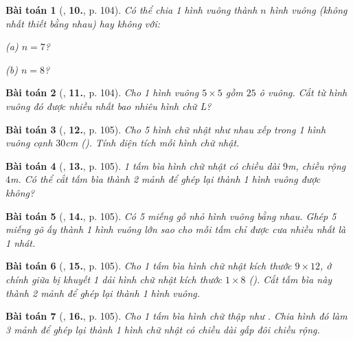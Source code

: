 \documentclass{article}
\numberwithin{equation}{section}
\newtheorem{baitoan}{Bài toán}[section]
\begin{document}
\begin{baitoan}[\cite{Binh_Toan_6_tap_1}, \textbf{10.}, p. 104]
	Có thể chia 1 hình vuông thành $n$ hình vuông (không nhất thiết bằng nhau) hay không với:
	\begin{enumerate*}
		\item[(a)] $n = 7$?
		\item[(b)] $n = 8$?
	\end{enumerate*}
\end{baitoan}

\begin{baitoan}[\cite{Binh_Toan_6_tap_1}, \textbf{11.}, p. 104]
	Cho 1 hình vuông $5\times 5$ gồm $25$ ô vuông. Cắt từ hình vuông đó được nhiều nhất bao nhiêu hình chữ L?
\end{baitoan}

\begin{baitoan}[\cite{Binh_Toan_6_tap_1}, \textbf{12.}, p. 105]
	Cho 5 hình chữ nhật như nhau xếp trong 1 hình vuông cạnh $30$\emph{cm} (\cite[Hình 31, p. 104]{Binh_Toan_6_tap_1}). Tính diện tích mỗi hình chữ nhật.
\end{baitoan}

\begin{baitoan}[\cite{Binh_Toan_6_tap_1}, \textbf{13.}, p. 105]
	1 tấm bìa hình chữ nhật có chiều dài $9$\emph{m}, chiều rộng $4$\emph{m}. Có thể cắt tấm bìa thành 2 mảnh để ghép lại thành 1 hình vuông được không?
\end{baitoan}

\begin{baitoan}[\cite{Binh_Toan_6_tap_1}, \textbf{14.}, p. 105]
	Có 5 miếng gỗ nhỏ hình vuông bằng nhau. Ghép 5 miếng gõ ấy thành 1 hình vuông lớn sao cho mỗi tấm chỉ được cưa nhiều nhất là 1 nhát.
\end{baitoan}

\begin{baitoan}[\cite{Binh_Toan_6_tap_1}, \textbf{15.}, p. 105]
	Cho 1 tấm bìa hình chữ nhật kích thước $9\times 12$, ở chính giữa bị khuyết 1 dải hình chữ nhật kích thước $1\times 8$ (\cite[Hình 32, p. 105]{Binh_Toan_6_tap_1}). Cắt tấm bìa này thành 2 mảnh để ghép lại thành 1 hình vuông.
\end{baitoan}

\begin{baitoan}[\cite{Binh_Toan_6_tap_1}, \textbf{16.}, p. 105]
	Cho 1 tấm bìa hình chữ thập như \cite[Hình 33, p. 105]{Binh_Toan_6_tap_1}. Chia hình đó làm 3 mảnh để ghép lại thành 1 hình chữ nhật có chiều dài gấp đôi chiều rộng.
\end{baitoan}
\end{document}
